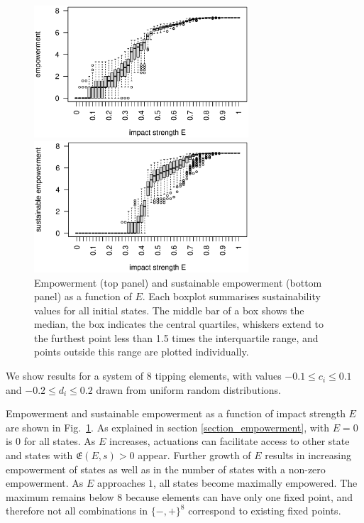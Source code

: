 \documentclass[conference]{IEEEtran}
\newcommand{\empowerment}{\ensuremath{\mathfrak{E}}}
\newcommand{\couplingconstant}{\ensuremath{d}}
\newcommand{\impactstrength}{\ensuremath{E}}
\begin{document}
\begin{figure}
  \begin{center}

    \includegraphics[width=8cm]{n08_full_small_emp.eps}

    \includegraphics[width=8cm]{n08_full_small_empsust.eps}

  \end{center}

  \caption{Empowerment (top panel) and sustainable empowerment
    (bottom panel) as a function of $\impactstrength$. Each boxplot summarises
    sustainability values for all initial states. The middle bar of
    a box shows the median, the box indicates the central quartiles,
    whiskers extend to the furthest point less than 1.5 times the
    interquartile range, and points outside this range are plotted
    individually.}
  \label{fig_empowermentprofiles}
\end{figure}

We show results for a system of $8$ tipping elements, with values
$-0.1 \le c_i \le 0.1$ and $-0.2 \le \couplingconstant_i \le 0.2$
drawn from uniform random distributions.

Empowerment and sustainable empowerment as a function of impact
strength $\impactstrength$ are shown in Fig.~\ref{fig_empowermentprofiles}. As
explained in section \ref{section_empowerment}, with $\impactstrength =
0$ is $0$ for all states. As $\impactstrength$ increases, actuations can facilitate
access to other state and states with $\empowerment(E, s) > 0$ appear.
Further growth of $\impactstrength$ results in increasing empowerment of states as
well as in the number of states with a non-zero empowerment. As $\impactstrength$
approaches $1$, all states become maximally empowered. The maximum
remains below $8$ because elements can have only one fixed point, and
therefore not all combinations in $\{-, +\}^{8}$ correspond to
existing fixed points.
\end{document}
